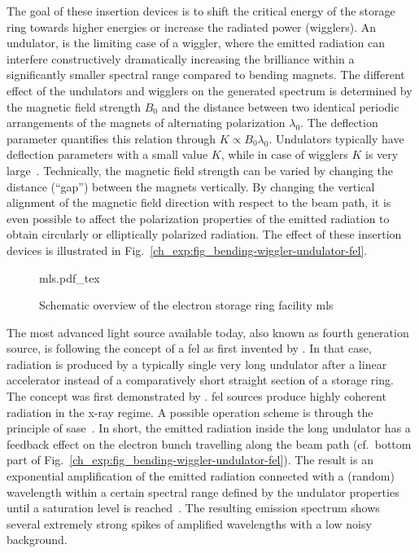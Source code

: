 The goal of these insertion devices is to shift the critical energy of the storage ring towards higher energies or increase the radiated power (wigglers). An undulator, is the limiting case of a wiggler, where the emitted radiation can interfere constructively dramatically increasing the brilliance within a significantly smaller spectral range compared to bending magnets. The different effect of the undulators and wigglers on the generated spectrum is determined by the magnetic field strength $B_0$ and the distance between two identical periodic arrangements of the magnets of alternating polarization $\lambda_0$. The deflection parameter quantifies this relation through $K \propto B_0 \lambda_0$. Undulators typically have deflection parameters with a small value $K$, while in case of wigglers $K$ is very large~\cite{munro_chapter_1987}. Technically, the magnetic field strength can be varied by changing the distance (``gap'') between the magnets vertically. By changing the vertical alignment of the magnetic field direction with respect to the beam path, it is even possible to affect the polarization properties of the emitted radiation to obtain circularly or elliptically polarized radiation. The effect of these insertion devices is illustrated in Fig.~\ref{ch_exp:fig_bending-wiggler-undulator-fel}.
\begin{figure}[htb]
    \def\svgwidth{0.7\textwidth}
    {mls.pdf_tex}
    \caption[Schematic overview of the MLS]{Schematic overview of the electron storage ring facility \gls{mls}}
    \label{ch_exp:fig_mls}
\end{figure}


The most advanced light source available today, also known as fourth generation source, is following the concept of a \gls{fel} as first invented by \textcite{madey_stimulated_1971}. In that case, radiation is produced by a typically single very long undulator after a linear accelerator instead of a comparatively short straight section of a storage ring. The concept was first demonstrated by \textcite{deacon_first_1977}. \Gls{fel} sources produce highly coherent radiation in the x-ray regime. A possible operation scheme is through the principle of \gls{sase}~\cite{derbenev_possibility_1982, bonifacio_collective_1984}. In short, the emitted radiation inside the long undulator has a feedback effect on the electron bunch travelling along the beam path (cf.~bottom part of Fig.~\ref{ch_exp:fig_bending-wiggler-undulator-fel}). The result is an exponential amplification of the emitted radiation connected with a (random) wavelength within a certain spectral range defined by the undulator properties until a saturation level is reached~\cite{milton_exponential_2001}. The resulting emission spectrum shows several extremely strong spikes of amplified wavelengths with a low noisy background. 

